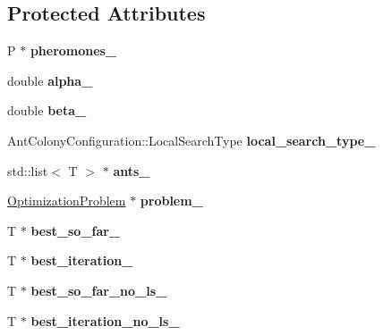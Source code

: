 \subsection*{Protected Attributes}
\begin{CompactItemize}
\item 
\hypertarget{classAntColony_8caa008736aa07ffd2b7125407126db8}{
P $\ast$ \textbf{pheromones\_\-}}
\label{classAntColony_8caa008736aa07ffd2b7125407126db8}

\item 
\hypertarget{classAntColony_790f9f0d9d6f452bb9b92d6eef86db10}{
double \textbf{alpha\_\-}}
\label{classAntColony_790f9f0d9d6f452bb9b92d6eef86db10}

\item 
\hypertarget{classAntColony_ff9c86f0fcbc70960925ad6bdda32f0d}{
double \textbf{beta\_\-}}
\label{classAntColony_ff9c86f0fcbc70960925ad6bdda32f0d}

\item 
\hypertarget{classAntColony_ee93d0421e0663a85a2c8ef5570aee7e}{
AntColonyConfiguration::LocalSearchType \textbf{local\_\-search\_\-type\_\-}}
\label{classAntColony_ee93d0421e0663a85a2c8ef5570aee7e}

\item 
\hypertarget{classAntColony_a2fe90465f65ef4ed374ed2c58049d9a}{
std::list$<$ T $>$ $\ast$ \textbf{ants\_\-}}
\label{classAntColony_a2fe90465f65ef4ed374ed2c58049d9a}

\item 
\hypertarget{classAntColony_c4290e064a01d849c700e527f7d81486}{
\hyperlink{classOptimizationProblem}{OptimizationProblem} $\ast$ \textbf{problem\_\-}}
\label{classAntColony_c4290e064a01d849c700e527f7d81486}

\item 
\hypertarget{classAntColony_27995e86165cb9742696427119ebe8d5}{
T $\ast$ \textbf{best\_\-so\_\-far\_\-}}
\label{classAntColony_27995e86165cb9742696427119ebe8d5}

\item 
\hypertarget{classAntColony_ac25a206baa571dd8c968cff992140cb}{
T $\ast$ \textbf{best\_\-iteration\_\-}}
\label{classAntColony_ac25a206baa571dd8c968cff992140cb}

\item 
\hypertarget{classAntColony_1e547e925018a29ef40a7dfe9bdf006e}{
T $\ast$ \textbf{best\_\-so\_\-far\_\-no\_\-ls\_\-}}
\label{classAntColony_1e547e925018a29ef40a7dfe9bdf006e}

\item 
\hypertarget{classAntColony_d396db834ac786f77e42fbc7f87b197c}{
T $\ast$ \textbf{best\_\-iteration\_\-no\_\-ls\_\-}}
\label{classAntColony_d396db834ac786f77e42fbc7f87b197c}

\end{CompactItemize}


